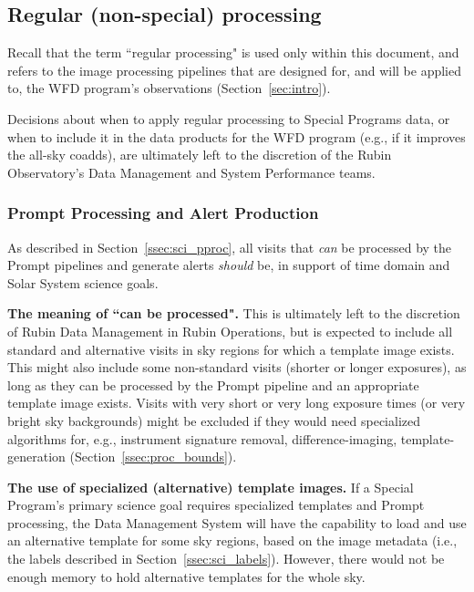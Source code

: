 \subsection{Regular (non-special) processing}\label{ssec:proc_reg}

Recall that the term ``regular processing" is used only within this document,
and refers to the image processing pipelines that are designed for, 
and will be applied to, the WFD program's observations (Section~\ref{sec:intro}).

Decisions about when to apply regular processing to Special Programs data,
or when to include it in the data products for the WFD program 
(e.g., if it improves the all-sky coadds), 
are ultimately left to the discretion of the Rubin Observatory's 
Data Management and System Performance teams.


\subsubsection{Prompt Processing and Alert Production}\label{sssec:proc_reg_prompt}

As described in Section~\ref{ssec:sci_pproc}, 
all visits that \emph{can} be processed by the Prompt pipelines and generate 
alerts \emph{should} be, in support of time domain and Solar System science goals.

\textbf{The meaning of ``can be processed".}
This is ultimately left to the discretion of
Rubin Data Management in Rubin Operations, but is expected to include
all standard and alternative visits in sky regions for which a template image exists.
This might also include some non-standard visits (shorter or longer exposures), 
as long as they can be processed by the Prompt pipeline and an appropriate template image exists.
Visits with very short or very long exposure times (or very bright sky 
backgrounds) might be excluded if they would need specialized algorithms for,
e.g., instrument signature removal, difference-imaging, template-generation 
(Section~\ref{ssec:proc_bounds}).

\textbf{The use of specialized (alternative) template images.}
If a Special Program's primary science goal requires specialized templates and 
Prompt processing, the Data Management System will have the capability to load 
and use an alternative template for some sky regions, based on the image metadata 
(i.e., the labels described in Section~\ref{ssec:sci_labels}). 
However, there would not be enough memory to hold alternative templates 
for the whole sky.

